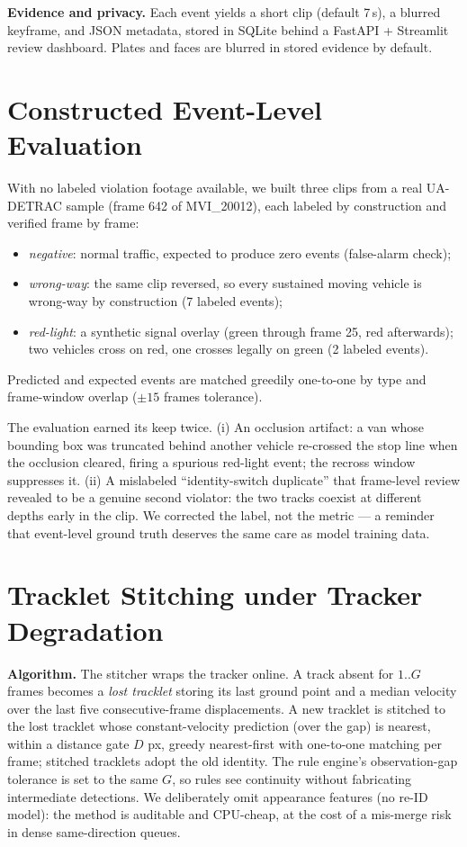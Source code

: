 \documentclass[conference]{IEEEtran}
\begin{document}
\textbf{Evidence and privacy.} Each event yields a short clip (default 7\,s),
a blurred keyframe, and JSON metadata, stored in SQLite behind a FastAPI +
Streamlit review dashboard. Plates and faces are blurred in stored evidence
by default.

\section{Constructed Event-Level Evaluation}
\label{sec:constructed}
With no labeled violation footage available, we built three clips from a real
UA-DETRAC sample (frame 642 of MVI\_20012), each labeled by construction and
verified frame by frame:
\begin{itemize}
  \item \emph{negative}: normal traffic, expected to produce zero events
        (false-alarm check);
  \item \emph{wrong-way}: the same clip reversed, so every sustained moving
        vehicle is wrong-way by construction (7 labeled events);
  \item \emph{red-light}: a synthetic signal overlay (green through frame 25,
        red afterwards); two vehicles cross on red, one crosses legally on
        green (2 labeled events).
\end{itemize}
Predicted and expected events are matched greedily one-to-one by type and
frame-window overlap ($\pm 15$ frames tolerance).

The evaluation earned its keep twice. (i) An occlusion artifact: a van whose
bounding box was truncated behind another vehicle re-crossed the stop line
when the occlusion cleared, firing a spurious red-light event; the recross
window suppresses it. (ii) A mislabeled ``identity-switch duplicate'' that
frame-level review revealed to be a genuine second violator: the two tracks
coexist at different depths early in the clip. We corrected the label, not
the metric --- a reminder that event-level ground truth deserves the same
care as model training data.

\section{Tracklet Stitching under Tracker Degradation}
\textbf{Algorithm.} The stitcher wraps the tracker online. A track absent for
$1..G$ frames becomes a \emph{lost tracklet} storing its last ground point
and a median velocity over the last five consecutive-frame displacements. A
new tracklet is stitched to the lost tracklet whose constant-velocity
prediction (over the gap) is nearest, within a distance gate $D$ px, greedy
nearest-first with one-to-one matching per frame; stitched tracklets adopt
the old identity. The rule engine's observation-gap tolerance is set to the
same $G$, so rules see continuity without fabricating intermediate
detections. We deliberately omit appearance features (no re-ID model): the
method is auditable and CPU-cheap, at the cost of a mis-merge risk in dense
same-direction queues.
\end{document}
